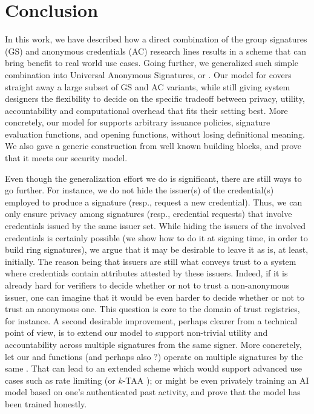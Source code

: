 \section{Conclusion}
\label{sec:conclusion}

In this work, we have described how a direct combination of the group signatures
(GS) and anonymous credentials (AC) research lines results in a scheme that can
bring benefit to real world use cases. Going further, we generalized such simple
combination into Universal Anonymous Signatures, or \UAS. Our model for \UAS
covers straight away a large subset of GS and AC variants, while still giving
system designers the flexibility to decide on the specific tradeoff between
privacy, utility, accountability and computational overhead that fits their
setting best. More concretely, our model for \UAS supports arbitrary issuance
policies, signature evaluation functions, and opening functions, without losing
definitional meaning. We also gave a generic construction from well known
building blocks, and prove that it meets our security model.

Even though the generalization effort we do is significant, there are still
ways to go further.
%
For instance, we do not hide the issuer(s) of the
credential(s) employed to produce a signature (resp., request a new credential).
Thus, we can only ensure privacy among signatures (resp., credential requests)
that involve credentials issued by the same issuer set. While hiding the issuers
of the involved credentials is certainly possible (we show how to do it at
signing time, in order to build ring signatures), we argue that it may be
desirable to leave it as is, at least, initially. The reason being that issuers
are still what conveys trust to a system where credentials contain attributes
attested by these issuers. Indeed, if it is already hard for verifiers to decide
whether or not to trust a non-anonymous issuer, one can imagine that it would be
even harder to decide whether or not to trust an anonymous one. This question
is core to the domain of trust registries, for instance.
%
A second desirable improvement, perhaps clearer from a technical point of view,
is to extend our model to support non-trivial utility and accountability across
multiple signatures from the same signer. More concretely, let our \feval and
\finsp functions (and perhaps also \fissue?) operate on multiple signatures by
the same \usk. That can lead to an extended \UAS scheme which would support
advanced use cases such as rate limiting (or $k$-TAA \cite{asm06}); or might
be even privately training an AI model based on one's authenticated
past activity, and prove that the model has been trained honestly.

